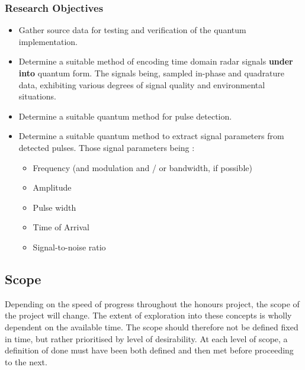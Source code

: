 \subsubsection{Research Objectives}
\begin{itemize}
    \item Gather source data for testing and verification of the quantum implementation.
    \item Determine a suitable method of encoding time domain radar signals \textbf{under into} quantum form. The signals being, sampled in-phase and quadrature data, exhibiting various degrees of signal quality and environmental situations.
    \item Determine a suitable quantum method for pulse detection.
    \item Determine a suitable quantum method to extract signal parameters from detected pulses. Those signal parameters being :
    \begin{itemize}
        \item Frequency (and modulation and / or bandwidth, if possible)
        \item Amplitude
        \item Pulse width
        \item Time of Arrival
        \item Signal-to-noise ratio
    \end{itemize}
\end{itemize}

\subsection{Scope}

Depending on the speed of progress throughout the honours project, the scope of the project will change. The extent of exploration into these concepts is wholly dependent on the available time. The scope should therefore not be defined fixed in time, but rather prioritised by level of desirability. At each level of scope, a definition of done must have been both defined and then met before proceeding to the next.



